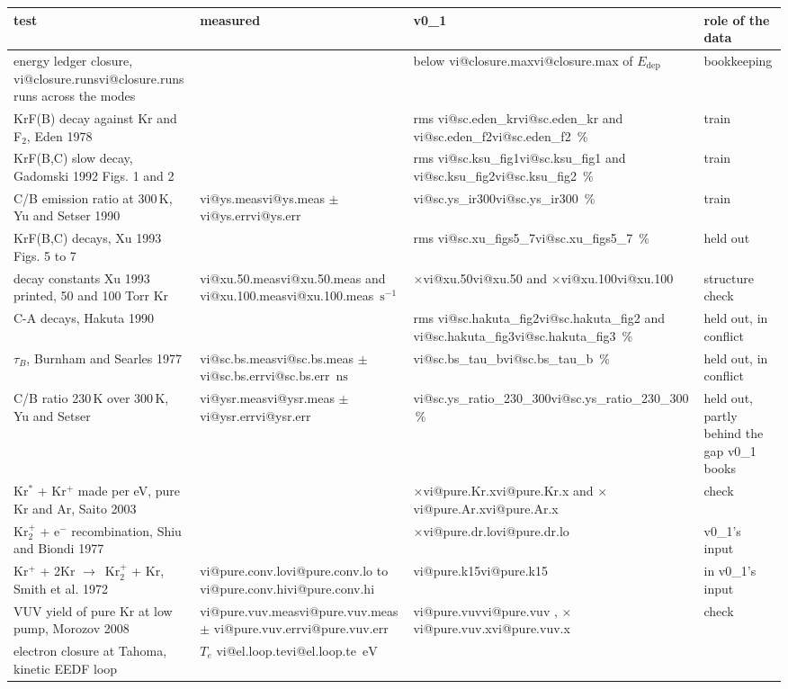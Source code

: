 \documentclass[11pt]{article}
\makeatletter
\newcommand\vi[1]{\ifcsname vi@#1\endcsname\csname vi@#1\endcsname
  \else\errmessage{no overview number '#1'. Rerun make_overview_v0_1.py}\fi}
\newcommand{\unit}[1]{\ensuremath{\,\mathrm{#1}}}
\newcommand{\el}{\ensuremath{\mathrm{e}^-}}
\newcommand{\Krs}{Kr\ensuremath{^*}}
\newcommand{\Krp}{Kr\ensuremath{^+}}
\newcommand{\Krtp}{Kr\ensuremath{_2^+}}
\newcommand{\ra}{\ensuremath{\to}\ }
\newcommand{\Edep}{\ensuremath{E_\mathrm{dep}}}
\newcommand{\x}[1]{\ensuremath{\times}#1}
\makeatother
\begin{document}
\begin{table}[h]
\centering\footnotesize
\renewcommand{\arraystretch}{1.12}
\begin{tabularx}{\linewidth}{@{}>{\raggedright\arraybackslash}X
  >{\raggedright\arraybackslash}p{2.6cm}>{\raggedright\arraybackslash}p{2.5cm}
  >{\raggedright\arraybackslash}p{2.5cm}@{}}
\toprule
test & measured & v0\_1 & role of the data\\
\midrule
energy ledger closure, \vi{closure.runs} runs across the modes & & below
  \vi{closure.max} of \Edep & bookkeeping\\
KrF(B) decay against Kr and F$_2$, Eden 1978 & & rms \vi{sc.eden_kr} and
  \vi{sc.eden_f2}\,\% & train\\
KrF(B,C) slow decay, Gadomski 1992 Figs. 1 and 2 & & rms \vi{sc.ksu_fig1}
  and \vi{sc.ksu_fig2}\,\% & train\\
C/B emission ratio at 300\unit{K}, Yu and Setser 1990 & \vi{ys.meas}
  $\pm$ \vi{ys.err} & \vi{sc.ys_ir300}\,\% & train\\
KrF(B,C) decays, Xu 1993 Figs. 5 to 7 & & rms \vi{sc.xu_figs5_7}\,\% &
  held out\\
decay constants Xu 1993 printed, 50 and 100 Torr Kr & \vi{xu.50.meas}
  and \vi{xu.100.meas}\unit{s^{-1}} & \x{\vi{xu.50}} and \x{\vi{xu.100}} &
  structure check\\
C-A decays, Hakuta 1990 & & rms \vi{sc.hakuta_fig2} and
  \vi{sc.hakuta_fig3}\,\% & held out, in conflict\\
$\tau_B$, Burnham and Searles 1977 & \vi{sc.bs.meas} $\pm$
  \vi{sc.bs.err}\unit{ns} & \vi{sc.bs_tau_b}\,\% & held out, in conflict\\
C/B ratio 230\unit{K} over 300\unit{K}, Yu and Setser & \vi{ysr.meas}
  $\pm$ \vi{ysr.err} & \vi{sc.ys_ratio_230_300}\,\% & held out, partly
  behind the gap v0\_1 books\\
\midrule
\Krs{} + \Krp{} made per eV, pure Kr and Ar, Saito 2003 & & \x{\vi{pure.Kr.x}}
  and \x{\vi{pure.Ar.x}} & check\\
\Krtp{} + \el{} recombination, Shiu and Biondi 1977 & & \x{\vi{pure.dr.lo}}
  & v0\_1's input\\
\Krp{} + 2Kr \ra \Krtp{} + Kr, Smith et al. 1972 & \vi{pure.conv.lo} to
  \vi{pure.conv.hi} & \vi{pure.k15} & in v0\_1's input\\
VUV yield of pure Kr at low pump, Morozov 2008 & \vi{pure.vuv.meas}
  $\pm$ \vi{pure.vuv.err} & \vi{pure.vuv}, \x{\vi{pure.vuv.x}} & check\\
electron closure at Tahoma, kinetic EEDF loop & $T_e$ \vi{el.loop.te}\unit{eV}

\end{tabularx}
\end{table}
\end{document}
